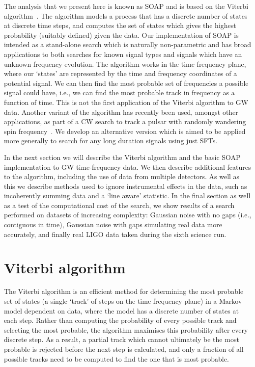 %
%
The analysis that we present here is known as SOAP \citep{ellis2006SnakesPlanea} and is based on the Viterbi algorithm~\citep{viterbi1967ErrorBounds}. The algorithm models a process that has a discrete number of states at discrete time steps, and computes the set of states which gives the highest probability (suitably defined) given the data. Our implementation of SOAP is intended as a stand-alone search which is naturally non-parametric and has broad applications to both searches for known signal types and signals which have an unknown frequency evolution. The algorithm works in the time-frequency plane, where our `states' are represented by the time and frequency coordinates of a potential signal. We can then find the most probable set of frequencies a possible signal could have, i.e., we can find the most probable track in frequency as a function of time. This is not the first application of the Viterbi algorithm to \gls{GW} data. Another variant of the algorithm \citep{suvorova2016HiddenMarkova} has recently been used, amongst other applications, as part of a \gls{CW} search to track a pulsar with randomly wandering spin frequency~\citep{sun2018HiddenMarkov, suvorova2017HiddenMarkov,abbott2017SearchGravitational, abbott2018SearchGravitational, sun2018ApplicationHidden}. We develop an alternative version which is aimed to be applied more generally to search for any long duration signals using just \glspl{SFT}.

%
%
In the next section we will describe the Viterbi algorithm and the basic SOAP implementation to \gls{GW} time-frequency data. We then describe additional features to the algorithm, including the use of data from multiple detectors. As well as this we describe methods used to ignore instrumental effects in the data, such as incoherently summing data and a `line aware' statistic. In the final section as well as a test of the computational cost of the search, we show results of a search performed on datasets of increasing complexity: Gaussian noise with no gaps (i.e., contiguous in time), Gaussian noise with gaps simulating real data more accurately, and finally real \gls{LIGO} data taken during the sixth science run. 


\section{\label{soap:viterbi}Viterbi algorithm}
%
%
The Viterbi algorithm is an efficient method for determining the most probable set of states (a single `track' of steps on the time-frequency plane) in a Markov model dependent on data, where the model has a discrete number of states at each step. Rather than computing the probability of every possible track and selecting the most probable, the algorithm maximises this probability after every discrete step. As a result, a partial track which cannot ultimately be the most probable is rejected before the next step is calculated, and only a fraction of all possible tracks need to be computed to find the one that is most probable.

